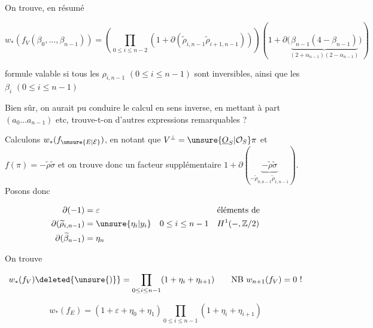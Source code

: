 
On trouve, en résumé

\[w_*(f_V(\beta_0,\ldots,\beta_{n-1}))=\left(\prod_{0\leq i\leq n-2}(1+\partial(\widetilde\rho_{i,n-1}\widetilde\rho_{i+1,n-1}))\right)\left(1+\partial\bigl(\underbrace{\beta_{n-1}(4-\beta_{n-1})}_{(2+\alpha_{n-1})(2-\alpha_{n-1})}\bigr)\right)\]

formule valable si tous les $\rho_{i,n-1}$ $(0\leq i\leq n-1)$ sont inversibles, ainsi que les $\beta_i$ $(0\leq i\leq n-1)$

Bien sûr, on aurait pu conduire le calcul en sens inverse, en mettant à part $(a_0\ldots a_{n-1})$ etc,  trouve-t-on d'autres expressions remarquables ?

Calculons $w_*(f_{\unsure{E|\mathcal E}})$,  en notant que $V^\perp=\unsure{\underline O_S|\mathcal O_S}\pi$ et $f(\pi)=-\widetilde\rho\widetilde\sigma$ et on trouve donc un facteur supplémentaire $1+\partial(\underbrace{-\widetilde\rho\widetilde\sigma}_{-\widetilde\rho_{0,n-1}\widetilde\rho_{1,n-1}})$. Posons donc

\[\begin{aligned}\partial(-1)&=\varepsilon&&&&\text{éléments de}\\ \partial(\widetilde\rho_{i,n-1})&=\unsure{\eta_i|y_i}&&0\leq i\leq n-1&& H^1(-,\mathbb Z/2)\\\partial(\widetilde\beta_{n-1})&=\eta_n\end{aligned}\]

On trouve

\[w_*(f_V)\deleted{\unsure{)}}=\prod_{0\leq i\leq n-1}(1+\eta_i+\eta_{i+1})\qquad\text{NB } w_{n+1}(f_V)=0\ !\]

\[w_*(f_E)=(1+\varepsilon+\eta_0+\eta_1)\prod_{0\leq i\leq n-1}(1+\eta_i+\eta_{i+1})\]

